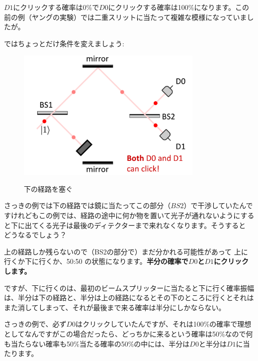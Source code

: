 $D1$にクリックする確率は0\%で$D0$にクリックする確率は100\%になります。この前の例（ヤングの実験）では二重スリットに当たって複雑な模様になっていましたが。

ではちょっとだけ条件を変えましょう:
\begin{figure}[H]
   \centering
    \includegraphics[width=0.8\textwidth]{lesson6/bottom_blocked.pdf}
    \label{fig: 1}
    \begin{center}
        \caption{下の経路を塞ぐ}
    \end{center}
\end{figure}
さっきの例では下の経路では鏡に当たってこの部分（$BS2$）で干渉していたんですけれどもこの例では、経路の途中に何か物を置いて光子が通れないようにすると下に出てくる光子は最後のディテクターまで来れなくなります。そうすると どうなるでしょう？

上の経路しか残らないので（BS2の部分で）まだ分かれる可能性があって
上に行くか下に行くか、50:50 の状態になります。\textbf{半分の確率で$D0$と$D1$にクリックします。}

ですが、下に行くのは、最初のビームスプリッターに当たると下に行く確率振幅は、半分は下の経路と、半分は上の経路になるとその下のところに行くとそれはまた消してしまって、それが最後まで来る確率は半分にしかならない。

さっきの例で、必ず$D0$はクリックしていたんですが、それは100\%の確率で理想としてなんですがこの場合だったら、どっちかに来るという確率は50\%なので何も当たらない確率も50\%当たる確率の50\%の中には、半分は$D0$と半分は$D1$に当たります。

